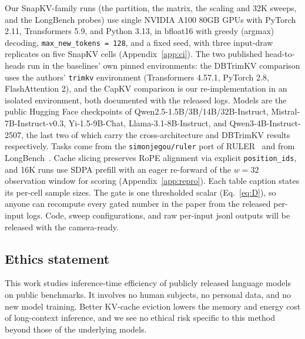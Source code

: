 \documentclass{article}
\begin{document}
Our SnapKV-family runs (the partition, the matrix, the scaling and 32K sweeps,
and the LongBench probes) use single NVIDIA A100 80GB GPUs with PyTorch 2.11,
Transformers 5.9, and Python 3.13, in bfloat16 with greedy (argmax) decoding,
\texttt{max\_new\_tokens = 128}, and a fixed seed, with three input-draw
replicates on five SnapKV cells (Appendix~\ref{app:ci}). The two published
head-to-heads run in the baselines' own pinned environments: the DBTrimKV
comparison uses the authors' \texttt{trimkv} environment (Transformers 4.57.1,
PyTorch 2.8, FlashAttention 2), and the CapKV comparison is our
re-implementation in an isolated environment, both documented with the released
logs. Models are the public Hugging Face checkpoints of Qwen2.5-1.5B/3B/14B/32B-Instruct,
Mistral-7B-Instruct-v0.3, Yi-1.5-9B-Chat, Llama-3.1-8B-Instruct, and
Qwen3-4B-Instruct-2507, the last two of which carry the cross-architecture and
DBTrimKV results respectively. Tasks come from the
\texttt{simonjegou/ruler} port of RULER~\citep{ruler-hf,kvpress} and from
LongBench~\citep{arxiv230814508}. Cache slicing preserves RoPE alignment via
explicit \texttt{position\_ids}, and 16K runs use SDPA prefill with an eager
re-forward of the $w = 32$ observation window for scoring
(Appendix~\ref{app:repro}). Each table caption states its per-cell sample
sizes. The gate is one thresholded scalar (Eq.~\eqref{eq:D}), so anyone can
recompute every gated number in the paper from the released per-input logs.
Code, sweep configurations, and raw per-input jsonl outputs will be released
with the camera-ready.

\subsection*{Ethics statement}

This work studies inference-time efficiency of publicly released language
models on public benchmarks. It involves no human subjects, no personal data,
and no new model training. Better KV-cache eviction lowers the memory and
energy cost of long-context inference, and we see no ethical risk specific to
this method beyond those of the underlying models.





\end{document}
